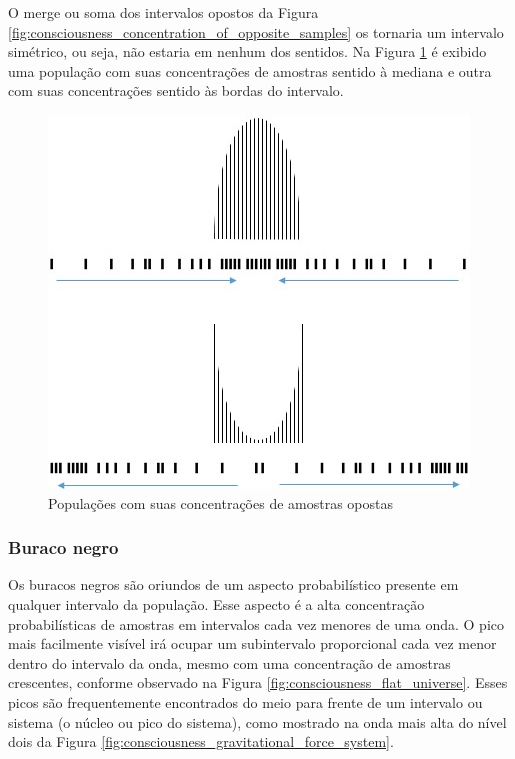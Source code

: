 O merge ou soma dos intervalos opostos da Figura \ref{fig:consciousness_concentration_of_opposite_samples} os tornaria um intervalo simétrico, ou seja, não estaria em nenhum dos sentidos.
Na Figura \ref{fig:consciousness_concentration_of_opposite_samples_within_range} é exibido uma população com suas concentrações de amostras sentido à mediana e outra com suas concentrações sentido às bordas do intervalo.
	\begin{figure}[H]
	\caption{Populações com suas concentrações de amostras opostas}
	\label{fig:consciousness_concentration_of_opposite_samples_within_range}
	\centering
	\includegraphics[scale=.7]{sections/images/consciousness_concentration_of_opposite_samples_within_range.jpg}
	\end{figure}

\subsubsection{Buraco negro}
Os buracos negros são oriundos de um aspecto probabilístico presente em qualquer intervalo da população. Esse aspecto é a alta concentração probabilísticas de amostras em intervalos cada vez menores de uma onda. O pico mais facilmente visível irá ocupar um subintervalo proporcional cada vez menor dentro do intervalo da onda, mesmo com uma concentração de amostras crescentes, conforme observado na Figura \ref{fig:consciousness_flat_universe}. Esses picos são frequentemente encontrados do meio para frente de um intervalo ou sistema (o núcleo ou pico do sistema), como mostrado na onda mais alta do nível dois da Figura \ref{fig:consciousness_gravitational_force_system}.

